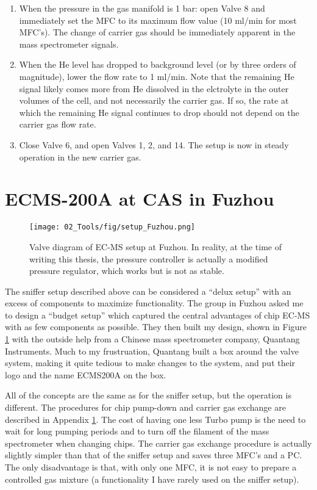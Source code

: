\begin{enumerate}
	\item When the pressure in the gas manifold is 1 bar: open Valve 8 and immediately set the MFC to its maximum flow value (10 ml/min for most MFC's). The change of carrier gas should be immediately apparent in the mass spectrometer signals.
	
	\item When the He level has dropped to background level (or by three orders of magnitude), lower the  flow rate to 1 ml/min. Note that the remaining He signal likely comes more from He dissolved in the elctrolyte in the outer volumes of the cell, and not necessarily the carrier gas. If so, the rate at which the remaining He signal continues to drop should not depend on the carrier gas flow rate.
	
	\item Close Valve 6, and open Valves 1, 2, and 14. The setup is now in steady operation in the new carrier gas.
	
\end{enumerate}


\section{ECMS-200A at CAS in Fuzhou}\label{app:Fuzhou}

\begin{figure}[h!]
	\centering
	\texttt{[image: 02\_Tools/fig/setup\_Fuzhou.png]}
	\caption{Valve diagram of EC-MS setup at Fuzhou. In reality, at the time of writing this thesis, the pressure controller is actually a modified pressure regulator, which works but is not as stable.}
	\label{fig:Fuzhou}
\end{figure}

The sniffer setup described above can be considered a ``delux setup'' with an excess of components to maximize functionality. The group in Fuzhou asked me to design a ``budget setup'' which captured the central advantages of chip EC-MS with as few components as possible. They then built my design, shown in Figure \ref{fig:Fuzhou} with the outside help from a Chinese mass spectrometer company, Quantang Instruments. Much to my frustruation, Quantang built a box around the valve system, making it quite tedious to make changes to the system, and put their logo and the name ECMS200A on the box.

All of the concepts are the same as for the sniffer setup, but the operation is different. The procedures for chip pump-down and carrier gas exchange are described in Appendix \ref{app:Fuzhou}. The cost of having one less Turbo pump is the need to wait for long pumping periods and to turn off the filament of the mass spectrometer when changing chips. The carrier gas exchange procedure is actually slightly simpler than that of the sniffer setup and saves three MFC's and a PC. The only disadvantage is that, with only one MFC, it is not easy to prepare a controlled gas mixture (a functionality I have rarely used on the sniffer setup).

